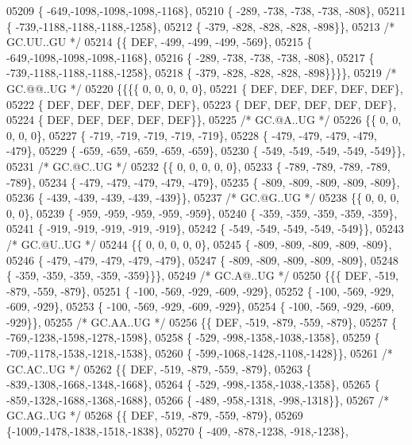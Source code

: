 \begin{DoxyCode}
05209 \{ -649,-1098,-1098,-1098,-1168\},
05210 \{ -289, -738, -738, -738, -808\},
05211 \{ -739,-1188,-1188,-1188,-1258\},
05212 \{ -379, -828, -828, -828, -898\}\},
05213 \textcolor{comment}{/* GC.UU..GU */}
05214 \{\{  DEF, -499, -499, -499, -569\},
05215 \{ -649,-1098,-1098,-1098,-1168\},
05216 \{ -289, -738, -738, -738, -808\},
05217 \{ -739,-1188,-1188,-1188,-1258\},
05218 \{ -379, -828, -828, -828, -898\}\}\}\},
05219 \textcolor{comment}{/* GC.@@..UG */}
05220 \{\{\{\{    0,    0,    0,    0,    0\},
05221 \{  DEF,  DEF,  DEF,  DEF,  DEF\},
05222 \{  DEF,  DEF,  DEF,  DEF,  DEF\},
05223 \{  DEF,  DEF,  DEF,  DEF,  DEF\},
05224 \{  DEF,  DEF,  DEF,  DEF,  DEF\}\},
05225 \textcolor{comment}{/* GC.@A..UG */}
05226 \{\{    0,    0,    0,    0,    0\},
05227 \{ -719, -719, -719, -719, -719\},
05228 \{ -479, -479, -479, -479, -479\},
05229 \{ -659, -659, -659, -659, -659\},
05230 \{ -549, -549, -549, -549, -549\}\},
05231 \textcolor{comment}{/* GC.@C..UG */}
05232 \{\{    0,    0,    0,    0,    0\},
05233 \{ -789, -789, -789, -789, -789\},
05234 \{ -479, -479, -479, -479, -479\},
05235 \{ -809, -809, -809, -809, -809\},
05236 \{ -439, -439, -439, -439, -439\}\},
05237 \textcolor{comment}{/* GC.@G..UG */}
05238 \{\{    0,    0,    0,    0,    0\},
05239 \{ -959, -959, -959, -959, -959\},
05240 \{ -359, -359, -359, -359, -359\},
05241 \{ -919, -919, -919, -919, -919\},
05242 \{ -549, -549, -549, -549, -549\}\},
05243 \textcolor{comment}{/* GC.@U..UG */}
05244 \{\{    0,    0,    0,    0,    0\},
05245 \{ -809, -809, -809, -809, -809\},
05246 \{ -479, -479, -479, -479, -479\},
05247 \{ -809, -809, -809, -809, -809\},
05248 \{ -359, -359, -359, -359, -359\}\}\},
05249 \textcolor{comment}{/* GC.A@..UG */}
05250 \{\{\{  DEF, -519, -879, -559, -879\},
05251 \{ -100, -569, -929, -609, -929\},
05252 \{ -100, -569, -929, -609, -929\},
05253 \{ -100, -569, -929, -609, -929\},
05254 \{ -100, -569, -929, -609, -929\}\},
05255 \textcolor{comment}{/* GC.AA..UG */}
05256 \{\{  DEF, -519, -879, -559, -879\},
05257 \{ -769,-1238,-1598,-1278,-1598\},
05258 \{ -529, -998,-1358,-1038,-1358\},
05259 \{ -709,-1178,-1538,-1218,-1538\},
05260 \{ -599,-1068,-1428,-1108,-1428\}\},
05261 \textcolor{comment}{/* GC.AC..UG */}
05262 \{\{  DEF, -519, -879, -559, -879\},
05263 \{ -839,-1308,-1668,-1348,-1668\},
05264 \{ -529, -998,-1358,-1038,-1358\},
05265 \{ -859,-1328,-1688,-1368,-1688\},
05266 \{ -489, -958,-1318, -998,-1318\}\},
05267 \textcolor{comment}{/* GC.AG..UG */}
05268 \{\{  DEF, -519, -879, -559, -879\},
05269 \{-1009,-1478,-1838,-1518,-1838\},
05270 \{ -409, -878,-1238, -918,-1238\},

\end{DoxyCode}

